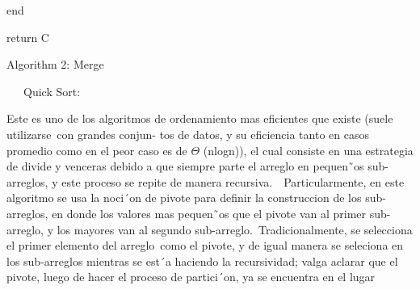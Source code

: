 \documentclass[12pt]{article}
\begin{document}
\begin{adjustwidth}{0.31in}{0.0in}
{\fontsize{11pt}{13.2pt}\selectfont end\par}\par

\end{adjustwidth}

\begin{adjustwidth}{0.31in}{0.0in}
{\fontsize{11pt}{13.2pt}\selectfont return  C\par}\par

\end{adjustwidth}

\begin{adjustwidth}{2.8in}{2.92in}
\begin{Center}
{\fontsize{11pt}{13.2pt}\selectfont Algorithm 2: Merge\par}
\end{Center}\par

\end{adjustwidth}


\vspace{\baselineskip}

\vspace{\baselineskip}
\begin{adjustwidth}{0.07in}{5.71in}
\begin{justify}
{\fontsize{14pt}{16.8pt}\ \ \   Quick  Sort:\par}
\end{justify}\par

\end{adjustwidth}


\vspace{\baselineskip}
\begin{adjustwidth}{0.07in}{0.05in}
\begin{justify}
{\fontsize{11pt}{13.2pt}\selectfont Este es uno de los algoritmos de ordenamiento mas eficientes que existe (suele utilizarse\  con grandes conjun- tos de datos,  y su eficiencia tanto en casos promedio como en el peor caso es de $ \Theta $ (nlogn)), el cual consiste en una estrategia de divide y venceras debido a que siempre parte  el arreglo en pequen˜os sub-arreglos,  y este proceso se repite  de manera  recursiva.\ \  Particularmente, en este algoritmo  se usa la noci´on de pivote  para definir la construccion  de los sub-arreglos,  en donde los valores mas pequen˜os que el pivote  van al primer sub-arreglo,  y los mayores  van al segundo sub-arreglo.\   Tradicionalmente, se selecciona el primer  elemento del arreglo\  como el pivote,  y de igual manera  se seleciona en los sub-arreglos  mientras  se est´a haciendo  la recursividad; valga aclarar  que el pivote,  luego de hacer el proceso de partici´on, ya se encuentra en el lugar\par}
\end{justify}\par

\end{adjustwidth}
\end{document}
